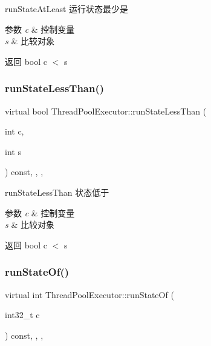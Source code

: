 run\+State\+At\+Least 运行状态最少是 


\begin{DoxyParams}{参数}
{\em c} & 控制变量 \\
\hline
{\em s} & 比较对象\\
\hline
\end{DoxyParams}
\begin{DoxyReturn}{返回}
bool c $<$ s 
\end{DoxyReturn}
\mbox{\label{classThreadPoolExecutor_aa12a3efb879080453fb7abc486585698}} 
\subsubsection{\texorpdfstring{run\+State\+Less\+Than()}{runStateLessThan()}}
{\footnotesize\ttfamily virtual bool Thread\+Pool\+Executor\+::run\+State\+Less\+Than (\begin{DoxyParamCaption}\item[{int}]{c,  }\item[{int}]{s }\end{DoxyParamCaption}) const\hspace{0.3cm}{\ttfamily [inline]}, {\ttfamily [final]}, {\ttfamily [protected]}, {\ttfamily [virtual]}}



run\+State\+Less\+Than 状态低于 


\begin{DoxyParams}{参数}
{\em c} & 控制变量 \\
\hline
{\em s} & 比较对象\\
\hline
\end{DoxyParams}
\begin{DoxyReturn}{返回}
bool c $<$ s 
\end{DoxyReturn}
\mbox{\label{classThreadPoolExecutor_acdb626fdcb6ed4c7822508d1e0a3fcf5}} 
\subsubsection{\texorpdfstring{run\+State\+Of()}{runStateOf()}}
{\footnotesize\ttfamily virtual int Thread\+Pool\+Executor\+::run\+State\+Of (\begin{DoxyParamCaption}\item[{int32\+\_\+t}]{c }\end{DoxyParamCaption}) const\hspace{0.3cm}{\ttfamily [inline]}, {\ttfamily [final]}, {\ttfamily [protected]}, {\ttfamily [virtual]}}



